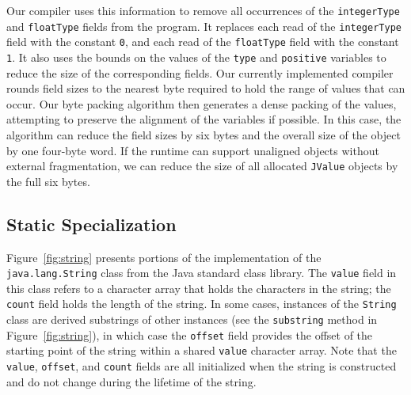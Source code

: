 \documentclass{sig-alt-full}
\begin{document}
Our compiler uses this information to remove all occurrences
of the {\tt integerType} and {\tt floatType} fields from the
program. It replaces each read of the {\tt integerType} field
with the constant {\tt 0}, and each read of the {\tt floatType}
field with the constant {\tt 1}. It also uses the bounds on the 
values of the {\tt type} and {\tt positive} variables to reduce the size of the 
corresponding fields. Our currently implemented compiler rounds
field sizes to the nearest byte required to hold the range
of values that can occur. Our byte packing algorithm then 
generates a dense packing of the values, attempting to preserve
the alignment of the variables if possible. In this case, the
algorithm can reduce the field sizes by six bytes and the overall
size of the object by one four-byte word.  If the runtime can support
unaligned objects without external fragmentation, we can reduce the
size of all allocated {\tt JValue} objects by the full six bytes.

\subsection{Static Specialization} 

Figure~\ref{fig:string} presents portions of the implementation
of the {\tt java.lang.String} class from the Java standard class
library. The {\tt value} field in this
class refers to a character array that holds the characters
in the string; the {\tt count} field holds the length of the
string. In some cases, instances of the {\tt String} class
are derived substrings of other instances 
(see the {\tt substring} method in Figure~\ref{fig:string}), in
which case the
{\tt offset} field provides the offset of the starting 
point of the string within a shared {\tt value} character array. 
Note that the {\tt value}, {\tt offset}, and {\tt count} 
fields are all initialized when the string is constructed
and do not change during the lifetime of the string.
\end{document}
